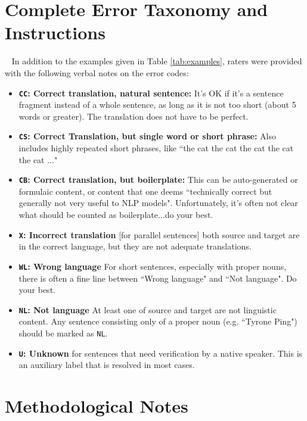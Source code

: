 \section{Complete Error Taxonomy and Instructions}~\label{app:taxonomy}
In addition to the examples given in Table \ref{tab:examples}, raters were provided with the following verbal notes on the error codes:
\begin{itemize}
    \item \textbf{\texttt{CC}: Correct translation, natural sentence:} It's OK if it's a sentence fragment instead of a whole sentence, as long as it is not too short (about 5 words or greater). The translation does not have to be perfect.
    \item \textbf{\texttt{\texttt{CS}}: Correct Translation, but single word or short phrase:} Also includes highly repeated short phrases, like ``the cat the cat the cat the cat the cat ..."
    \item \textbf{\texttt{CB}: Correct translation, but boilerplate: } This can be auto-generated or formulaic content, or content that one deems ``technically correct but generally not very useful to NLP models". Unfortunately, it's often not clear what should be counted as boilerplate...do your best.
    \item \textbf{\texttt{X}: Incorrect translation} [for parallel sentences] both source and target are in the correct language, but they are not adequate translations.
    \item \textbf{\texttt{WL}: Wrong language} For short sentences, especially with proper nouns, there is often a fine line between ``Wrong language" and ``Not language". Do your best.
    \item \textbf{\texttt{NL}: Not language} At least one of source and target are not linguistic content. Any sentence consisting only of a proper noun (e.g. ``Tyrone Ping") should be marked as \texttt{NL}.
    \item \textbf{\texttt{U}: Unknown} for sentences that need verification by a native speaker. This is an auxiliary label that is resolved in most cases.
\end{itemize}







\section{Methodological Notes}\label{app:strategies}

